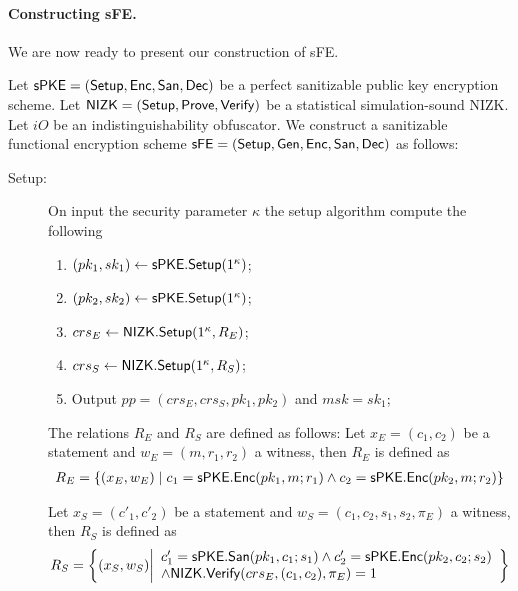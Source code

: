 \documentclass{llncs}
\begin{document}
\paragraph{Constructing sFE.} We are now ready to present our construction of sFE.

\begin{construction} \label{con:sanFE}
Let $\mathsf{sPKE} = (\mathsf{Setup}, \mathsf{Enc}, \mathsf{San}, \mathsf{Dec})$ be a perfect sanitizable public key encryption scheme.
Let $\mathsf{NIZK} = (\mathsf{Setup}, \mathsf{Prove}, \mathsf{Verify})$ be a statistical simulation-sound NIZK.
Let $iO$ be an indistinguishability obfuscator.
We construct a sanitizable functional encryption scheme $\mathsf{sFE} = (\mathsf{Setup}, \mathsf{Gen}, \mathsf{Enc},\mathsf{San}, \mathsf{Dec})$ as follows:
\end{construction}
\begin{description}
\item[Setup:] On input the security parameter $\kappa$ the setup algorithm compute the following
	\begin{enumerate}
	\item $(pk_1,sk_1) \gets \mathsf{sPKE}.\mathsf{Setup}(1^\kappa)$;
	\item $(pk_2,sk_2) \gets \mathsf{sPKE}.\mathsf{Setup}(1^\kappa)$;
	\item $crs_E \gets \mathsf{NIZK}.\mathsf{Setup}(1^\kappa,R_E)$;
	\item $crs_S \gets \mathsf{NIZK}.\mathsf{Setup}(1^\kappa,R_S)$;
	\item Output  $pp = (crs_E, crs_S, pk_1, pk_2)$ and  $msk = sk_1$;
	\end{enumerate}

	The relations $R_E$ and $R_S$ are defined as follows: Let $x_E=(c_1,c_2)$ be a statement and $w_E = (m,r_1,r_2)$ a witness, then $R_E$ is defined as
	\begin{align*}
		R_E = \left\lbrace (x_E,w_E) \mid c_1 = \mathsf{sPKE}.\mathsf{Enc}(pk_1,m;r_1) \wedge c_2 = \mathsf{sPKE}.\mathsf{Enc}(pk_2,m;r_2) \right\rbrace
	\end{align*}
	
	Let $x_S=(c'_1,c'_2)$ be a statement and $w_S = (c_1,c_2,s_1,s_2,\pi_E)$ a witness, then $R_S$ is defined as
	\begin{align*}
		R_S = \left\lbrace (x_S,w_S) \middle|	
			\begin{array}{l}
				c'_1 = \mathsf{sPKE}.\mathsf{San}(pk_1,c_1;s_1) \wedge c'_2 = \mathsf{sPKE}.\mathsf{Enc}(pk_2,c_2;s_2)  \\
				\wedge \mathsf{NIZK}.\mathsf{Verify}(crs_E,(c_1,c_2),\pi_E) = 1
			\end{array} 
		\right\rbrace
	\end{align*}
	

\end{description}
\end{document}
